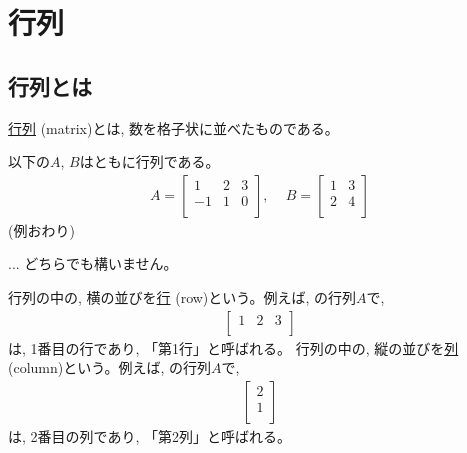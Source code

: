 \chapter{行列}\label{chap:matrix}

\section{行列とは}

\underline{行列} (matrix)とは, 数を格子状に並べたものである。

\begin{exmpl} 以下の$A$, $B$はともに行列である。
\begin{eqnarray}
A=\begin{bmatrix}
1 & 2 & 3\\
-1 & 1 & 0\\
\end{bmatrix},\,\,\,\,\,\,\,
B=\begin{bmatrix}
1 & 3\\
2 & 4\\
\end{bmatrix}
\label{eq:matrix32ex}
\end{eqnarray}
(例おわり)\end{exmpl}

\begin{faq}{\small{}
... どちらでも構いません。}\end{faq}

行列の中の, 横の並びを\underline{行}  (row)という。例えば, の行列$A$で, 
\begin{eqnarray}
\begin{bmatrix}
1 & 2 & 3\\
\end{bmatrix}
\label{eq:matrix31ex} 
\end{eqnarray}
は, 1番目の行であり, 「第1行」と呼ばれる。
行列の中の, 縦の並びを\underline{列}  (column)という。例えば, の行列$A$で, 
\begin{eqnarray}
\begin{bmatrix}
2\\
1\\
\end{bmatrix}\label{eq:matrix12ex}
\end{eqnarray}
は, 2番目の列であり, 「第2列」と呼ばれる。

